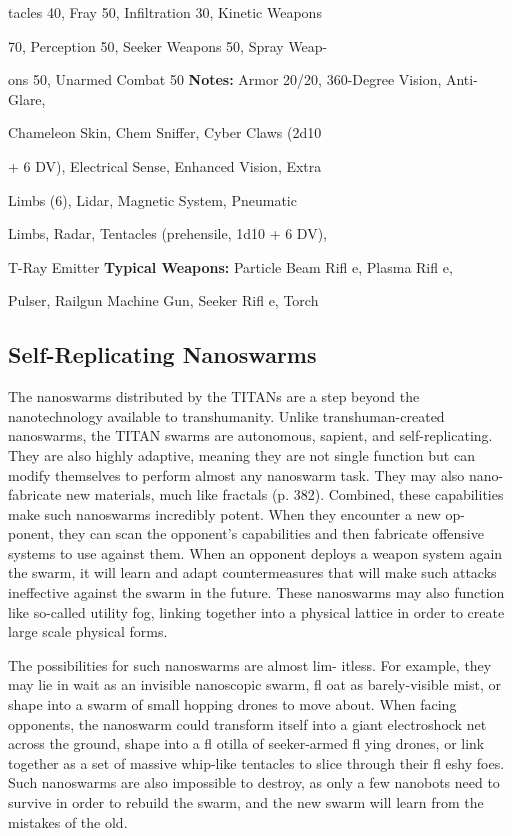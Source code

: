 tacles 40, Fray 50, Infiltration 30, Kinetic Weapons 

70, Perception 50, Seeker Weapons 50, Spray Weap-

ons 50, Unarmed Combat 50
\textbf{Notes:} Armor 20/20, 360-Degree Vision, Anti-Glare, 

Chameleon Skin, Chem Sniffer, Cyber Claws (2d10 

+ 6 DV), Electrical Sense, Enhanced Vision, Extra 

Limbs (6), Lidar, Magnetic System, Pneumatic 

Limbs, Radar, Tentacles (prehensile, 1d10 + 6 DV), 

T-Ray Emitter
\textbf{Typical Weapons:} Particle Beam Rifl e, Plasma Rifl e, 

Pulser, Railgun Machine Gun, Seeker Rifl e, Torch

\subsection{Self-Replicating Nanoswarms}

The nanoswarms distributed by the TITANs are a step 
beyond the nanotechnology available to transhumanity. 
Unlike transhuman-created nanoswarms, the TITAN 
swarms are autonomous, sapient, and self-replicating. 
They are also highly adaptive, meaning they are not 
single function but can modify themselves to perform 
almost any nanoswarm task. They may also nano-
fabricate new materials, much like fractals (p. 382). 
Combined, these capabilities make such nanoswarms 
incredibly potent. When they encounter a new op-
ponent, they can scan the opponent's capabilities and 
then fabricate offensive systems to use against them. 
When an opponent deploys a weapon system again the 
swarm, it will learn and adapt countermeasures that 
will make such attacks ineffective against the swarm in 
the future. These nanoswarms may also function like 
so-called utility fog, linking together into a physical 
lattice in order to create large scale physical forms.

The possibilities for such nanoswarms are almost lim-
itless. For example, they may lie in wait as an invisible 
nanoscopic swarm, fl oat as barely-visible mist, or shape 
into a swarm of small hopping drones to move about. 
When facing opponents, the nanoswarm could transform 
itself into a giant electroshock net across the ground, 
shape into a fl otilla of seeker-armed fl ying drones, or 
link together as a set of massive whip-like tentacles to 
slice through their fl eshy foes. Such nanoswarms are 
also impossible to destroy, as only a few nanobots need 
to survive in order to rebuild the swarm, and the new 
swarm will learn from the mistakes of the old.

